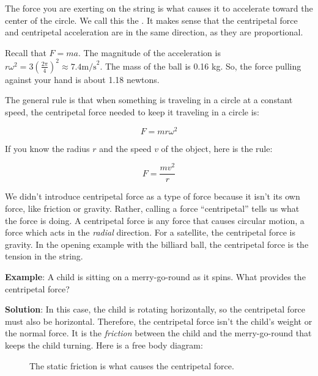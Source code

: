 The force you are exerting on the string is what causes it to accelerate toward the center of the circle. We call this the . It makes sense that the centripetal force and centripetal acceleration are in the same direction, as they are proportional. 

Recall that $F = m a$. The magnitude of the acceleration is $r \omega^2 = 3 \left(\frac{2 \pi}{4}\right)^2 \approx 7.4 \mathrm{ m/s}^2$. The mass
of the ball is 0.16 kg. So, the force pulling against your hand is about 1.18 newtons.

The general rule is that when something is traveling in a circle at a
constant speed, the centripetal force needed to keep it traveling in a
circle is:

$$F = m r \omega^2$$

If you know the radius $r$ and the speed $v$ of the object, here is the rule:

$$F = \frac{m v^2}{r}$$

We didn't introduce centripetal force as a type of force because it isn't its own force, like friction or gravity. Rather, calling a force ``centripetal'' tells us what the force is doing. A centripetal force is any force that causes circular motion, a force which acts in the \emph{radial} direction. For a satellite, the centripetal force is gravity. In the opening example with the billiard ball, the centripetal force is the tension in the string.

\textbf{Example}: A child is sitting on a merry-go-round as it spins. What provides the centripetal force?

\textbf{Solution}: In this case, the child is rotating horizontally, so the centripetal force must also be horizontal. Therefore, the centripetal force isn't the child's weight or the normal force. It is the \textit{friction} between the child and the merry-go-round that keeps the child turning. Here is a free body diagram:

\begin{figure}[H]
  \centering
  \caption{The static friction is what causes the centripetal force.}
  \label{fig:merrygoround_fbd}
\end{figure}


